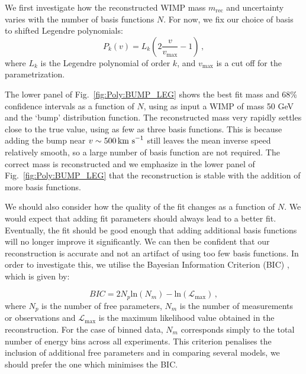 We first investigate how the reconstructed WIMP mass $m_\textrm{rec}$ and uncertainty varies with the number of basis functions $N$. For now, we fix our choice of basis to shifted Legendre polynomials:
\begin{equation}
P_k(v) = L_k\left(2\frac{v}{v_\textrm{max}} - 1\right)\,,
\end{equation}
where $L_k$ is the Legendre polynomial of order $k$, and $v_\textrm{max}$ is a cut off for the parametrization.
 
The lower panel of Fig.~\ref{fig:Poly:BUMP_LEG} shows the best fit mass and 68\% confidence intervals as a function of $N$, using as input a WIMP of mass 50 GeV and the `bump' distribution function. The reconstructed mass very rapidly settles close to the true value, using as few as three basis functions. This is because adding the bump near $v \sim 500 \,\textrm{km s}^{-1}$ still leaves the mean inverse speed relatively smooth, so a large number of basis function are not required. The correct mass is reconstructed and we emphasize in the lower panel of Fig.~\ref{fig:Poly:BUMP_LEG} that the reconstruction is stable with the addition of more basis functions.

We should also consider how the quality of the fit changes as a function of $N$. We would expect that adding fit parameters should always lead to a better fit. Eventually, the fit should be good enough that adding additional basis functions will no longer improve it significantly. We can then be confident that our reconstruction is accurate and not an artifact of using too few basis functions. In order to investigate this, we utilise the Bayesian Information Criterion (BIC) \cite{Schwarz:1978}, which is given by:

\begin{equation}
BIC = 2N_p\textrm{ln}(N_m) - \textrm{ln}(\mathcal{L}_\textrm{max}) \, ,
\end{equation}
where $N_p$ is the number of free parameters, $N_m$ is the number of measurements or observations and $\mathcal{L}_\textrm{max}$ is the maximum likelihood value obtained in the reconstruction. For the case of binned data, $N_m$ corresponds simply to the total number of energy bins across all experiments. This criterion penalises the inclusion of additional free parameters and in comparing several models, we should prefer the one which minimises the BIC.


